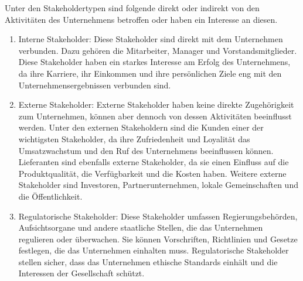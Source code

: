 Unter den Stakeholdertypen sind folgende direkt oder indirekt von den Aktivitäten des Unternehmens betroffen oder haben
ein Interesse an diesen.
\begin{enumerate}
    \item Interne Stakeholder: Diese Stakeholder sind direkt mit dem Unternehmen verbunden.
    Dazu gehören die Mitarbeiter, Manager und Vorstandsmitglieder.
    Diese Stakeholder haben ein starkes Interesse am Erfolg des Unternehmens, da ihre Karriere,
    ihr Einkommen und ihre persönlichen Ziele eng mit den Unternehmensergebnissen verbunden sind.
    \item Externe Stakeholder: Externe Stakeholder haben keine direkte Zugehörigkeit zum Unternehmen,
    können aber dennoch von dessen Aktivitäten beeinflusst werden.
    Unter den externen Stakeholdern sind die Kunden einer der wichtigsten Stakeholder,
    da ihre Zufriedenheit und Loyalität das Umsatzwachstum und den Ruf des Unternehmens beeinflussen können.
    Lieferanten sind ebenfalls externe Stakeholder, da sie einen Einfluss auf die Produktqualität,
    die Verfügbarkeit und die Kosten haben.
    Weitere externe Stakeholder sind Investoren, Partnerunternehmen, lokale Gemeinschaften und die Öffentlichkeit.
    \item Regulatorische Stakeholder: Diese Stakeholder umfassen Regierungsbehörden,
    Aufsichtsorgane und andere staatliche Stellen, die das Unternehmen regulieren oder überwachen.
    Sie können Vorschriften, Richtlinien und Gesetze festlegen, die das Unternehmen einhalten muss.
    Regulatorische Stakeholder stellen sicher, dass das Unternehmen ethische Standards einhält und die Interessen der Gesellschaft schützt.
\end{enumerate}

